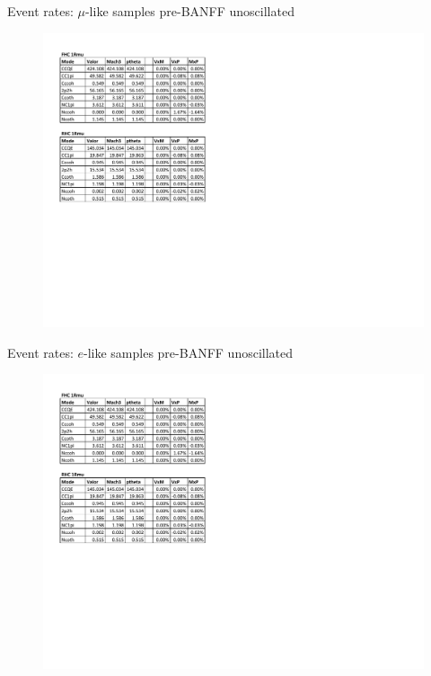 \documentclass{beamer}
\begin{document}
\begin{frame}{Event rates: $\mu$-like samples pre-BANFF unoscillated}
	\centering
	\begin{figure}
		\includegraphics[page=1, trim={0cm 9cm 13cm 1cm}, clip, scale=0.52] {images/rates/prefit_unosc}
	\end{figure}
\end{frame}

\begin{frame}{Event rates: $e$-like samples pre-BANFF unoscillated}
	\centering
	\begin{figure}
		\includegraphics[page=2, trim={0cm 8cm 13cm 1cm}, clip, scale=0.52] {images/rates/prefit_unosc}
	\end{figure}
\end{frame}
\end{document}
